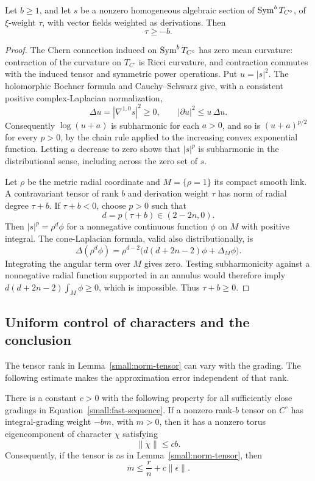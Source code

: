 \begin{lemma}
\label{small:tensor-bound}
Let \(b\geq1\), and let \(s\) be a nonzero homogeneous algebraic section
of \(\operatorname{Sym}^bT_{C^\circ}\), of \(\xi\)-weight \(\tau\), with vector fields
weighted as derivations.  Then
\[
 \tau\geq-b.
\]
\end{lemma}

\begin{proof}
The Chern connection induced on \(\operatorname{Sym}^bT_{C^\circ}\) has zero mean
curvature: contraction of the curvature on \(T_{C^\circ}\) is Ricci
curvature, and contraction commutes with the induced tensor and symmetric
power operations.  Put \(u=|s|^2\).  The holomorphic Bochner formula and
Cauchy--Schwarz give, with a consistent positive complex-Laplacian
normalization,
\[
 \Delta u=|\nabla^{1,0}s|^2\geq0,
 \qquad |\partial u|^2\leq u\,\Delta u.
\]
Consequently \(\log(u+a)\) is subharmonic for each \(a>0\), and so is
\((u+a)^{p/2}\) for every \(p>0\), by the chain rule applied to the
increasing convex exponential function.  Letting \(a\) decrease to zero
shows that \(|s|^p\) is subharmonic in the distributional sense, including
across the zero set of \(s\).

Let \(\rho\) be the metric radial coordinate and \(M=\{\rho=1\}\) its
compact smooth link.  A contravariant tensor of rank \(b\) and derivation
weight \(\tau\) has norm of radial degree \(\tau+b\).  If
\(\tau+b<0\), choose \(p>0\) such that
\[
 d=p(\tau+b)\in(2-2n,0).
\]
Then \(|s|^p=\rho^d\phi\) for a nonnegative continuous function
\(\phi\) on \(M\) with positive integral.  The cone-Laplacian formula,
valid also distributionally, is
\[
 \Delta(\rho^d\phi)
 =\rho^{d-2}\bigl(d(d+2n-2)\phi+\Delta_M\phi\bigr).
\]
Integrating the angular term over \(M\) gives zero.  Testing
subharmonicity against a nonnegative radial function supported in an
annulus would therefore imply
\(d(d+2n-2)\int_M\phi\geq0\), which is impossible.  Thus
\(\tau+b\geq0\).
\end{proof}

\subsection{Uniform control of characters and the conclusion}

The tensor rank in Lemma~\ref{small:norm-tensor} can vary with the
grading.  The following estimate makes the approximation error
independent of that rank.

\begin{lemma}
\label{small:character-estimate}
There is a constant \(c>0\) with the following property for all
sufficiently close gradings in Equation~\eqref{small:fast-sequence}.
If a nonzero rank-\(b\) tensor on \(C^\circ\) has integral-grading
weight \(-bm\), with \(m>0\), then it has a nonzero torus
eigencomponent of character \(\chi\) satisfying
\[
 \|\chi\|\leq cb.
\]
Consequently, if the tensor is as in
Lemma~\ref{small:norm-tensor}, then
\begin{equation}
 m\leq\frac rn+c\|\epsilon\|.
 \label{small:m-bound}
\end{equation}
\end{lemma}

